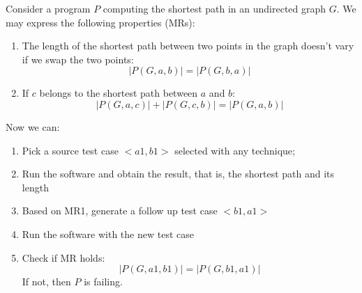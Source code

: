 \begin{examplebox}
    Consider a program $P$ computing the shortest path in an undirected graph $G$. We may express the following properties (MRs):
    \begin{enumerate}[label=\textbf{MR\arabic*}]
        \item The length of the shortest path between two points in the graph doesn't vary if we swap the two points:
        \begin{equation*}
            \left| P\left(G,a,b\right) \right| = \left| P\left(G,b,a\right) \right|
        \end{equation*}

        \item If $c$ belongs to the shortest path between $a$ and $b$:
        \begin{equation*}
            \left| P\left(G,a,c\right) \right| + \left| P\left(G,c,b\right) \right| = \left| P\left(G,a,b\right) \right|
        \end{equation*}
    \end{enumerate}
    Now we can:
    \begin{enumerate}
        \item Pick a source test case $<a1, b1>$ selected with any technique;
        \item Run the software and obtain the result, that is, the shortest path and its length
        \item Based on MR1, generate a follow up test case $<b1, a1>$
        \item Run the software with the new test case
        \item Check if MR holds: 
        \begin{equation*}
            \left| P\left(G,a1,b1\right) \right| = \left| P\left(G,b1,a1\right) \right|
        \end{equation*}
        If not, then $P$ is failing.
    \end{enumerate}
\end{examplebox}